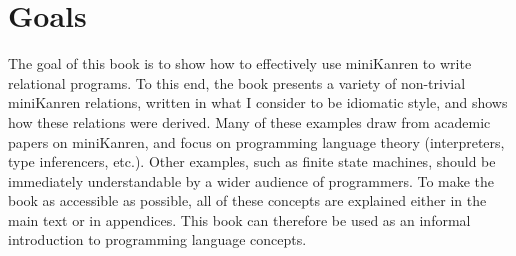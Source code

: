 \section{Goals}\label{sec:preface:goals}



%

The goal of this book is to show how to effectively use miniKanren to
write relational programs.
%
%
To this end, the book presents a variety of non-trivial miniKanren
relations, written in what I consider to be idiomatic style, and shows
how these relations were derived.
%
Many of these examples draw from academic papers on miniKanren, and
focus on programming language theory (interpreters, type inferencers,
etc.).
%
Other examples, such as finite state machines, should be immediately
understandable by a wider audience of programmers.
%
To make the book as accessible as possible, all of these concepts are
explained either in the main text or in appendices.
%
This book can therefore be used as an informal introduction to programming language concepts.



